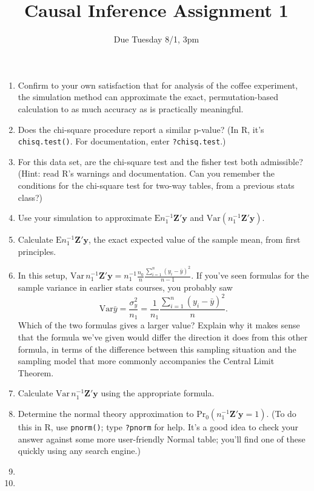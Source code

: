 \documentclass{article}
\title{Causal Inference Assignment 1}
\author{Due Tuesday 8/1, 3pm}
\begin{document}
\maketitle

\begin{enumerate}
\item Confirm to your own satisfaction that for analysis of the coffee experiment, the simulation method can approximate the exact, permutation-based calculation to as much accuracy as is practically meaningful.
\item Does the chi-square procedure report a similar p-value?  (In R,
  it's \texttt{chisq.test()}. For documentation, enter \texttt{?chisq.test}.)
\item For this data set, are the chi-square test and the fisher test
  both admissible? (Hint: read R's warnings and documentation.  Can
  you remember the conditions for the chi-square test for two-way
  tables, from a previous stats class?)
\item Use your simulation to approximate $\mathrm{E} n_{1}^{-1}\mathbf{Z}'\mathbf{y} $ and
  $\mathrm{Var}(n_{1}^{-1}\mathbf{Z}'\mathbf{y}) $. 
\item Calculate $\mathrm{E}  n_{1}^{-1}\mathbf{Z}'\mathbf{y} $, the exact expected value of the
  sample mean, from first principles.  
\item In this setup, $\mathrm{Var}\, n_{1}^{-1}\mathbf{Z}'\mathbf{y}  = n_{1}^{-1}
  \frac{n_{0}}{n} \frac{\sum_{i=1}^{n} (y_{i} - \bar y)^{2}}{n-1} $.
  If you've seen formulas for the sample variance in earlier stats
  courses, you probably saw
  $$
  \mathrm{Var} \bar{y} = \frac{\sigma_{y}^{2}}{n_{1}} = \frac{1}{n_{1}}
  \frac{\sum_{i=1}^{n} (y_{i} - \bar y)^{2}}{n} .
  $$
Which of the two formulas gives a larger value?  Explain why it makes
sense that the formula we've given would differ the direction it does
from this other formula, in terms of the difference between this
sampling situation and the sampling model that more commonly
accompanies the Central Limit Theorem.
\item Calculate $ \mathrm{Var}\, n_{1}^{-1}\mathbf{Z}'\mathbf{y} $ using the appropriate
  formula. 
\item Determine the normal theory approximation to
  $\mathrm{Pr}_{0}(n_{1}^{-1}\mathbf{Z}'\mathbf{y} =1 ) $.  (To do this in R, use
  \texttt{pnorm()}; type \texttt{?pnorm} for help. It's a good idea to
  check your answer against some 
  more user-friendly Normal table; you'll find one of these quickly
  using any search engine.)
\item

\item

\end{enumerate}
\end{document}
